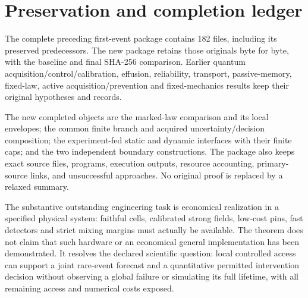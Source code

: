 \section{Preservation and completion ledger}
The complete preceding first-event package contains 182 files, including
its preserved predecessors. The new package retains those originals
byte for byte, with the baseline and final SHA-256 comparison. Earlier
quantum acquisition/control/calibration, effusion, reliability,
transport, passive-memory, fixed-law, active acquisition/prevention and
fixed-mechanics results keep their original hypotheses and records.

The new completed objects are the marked-law comparison and its local
envelopes; the common finite branch and acquired uncertainty/decision
composition; the experiment-fed static and dynamic interfaces with
their finite caps; and the two independent boundary constructions.
The package also keeps exact source files, programs, execution outputs,
resource accounting, primary-source links, and unsuccessful approaches.
No original proof is replaced by a relaxed summary.

The substantive outstanding engineering task is economical realization
in a specified physical system: faithful cells, calibrated strong fields,
low-cost pins, fast detectors and strict mixing margins must actually
be available. The theorem does not claim that such hardware or an
economical general implementation has been demonstrated. It resolves
the declared scientific question: local controlled access can support a
joint rare-event forecast and a quantitative permitted intervention
decision without observing a global failure or simulating its full
lifetime, with all remaining access and numerical costs exposed.

